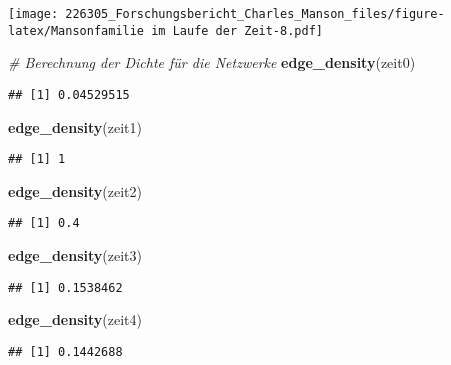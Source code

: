 \documentclass[
]{article}
\newenvironment{Shaded}{\begin{snugshade}}{\end{snugshade}}
\newcommand{\CommentTok}[1]{\textcolor[rgb]{0.56,0.35,0.01}{\textit{#1}}}
\newcommand{\KeywordTok}[1]{\textcolor[rgb]{0.13,0.29,0.53}{\textbf{#1}}}
\newcommand{\NormalTok}[1]{#1}
\begin{document}
\texttt{[image: 226305\_Forschungsbericht\_Charles\_Manson\_files/figure-latex/Mansonfamilie im Laufe der Zeit-8.pdf]}

\begin{Shaded}
\begin{Highlighting}[]
\CommentTok{# Berechnung der Dichte für die Netzwerke}
\KeywordTok{edge_density}\NormalTok{(zeit0)}
\end{Highlighting}
\end{Shaded}

\begin{verbatim}
## [1] 0.04529515
\end{verbatim}

\begin{Shaded}
\begin{Highlighting}[]
\KeywordTok{edge_density}\NormalTok{(zeit1)}
\end{Highlighting}
\end{Shaded}

\begin{verbatim}
## [1] 1
\end{verbatim}

\begin{Shaded}
\begin{Highlighting}[]
\KeywordTok{edge_density}\NormalTok{(zeit2)}
\end{Highlighting}
\end{Shaded}

\begin{verbatim}
## [1] 0.4
\end{verbatim}

\begin{Shaded}
\begin{Highlighting}[]
\KeywordTok{edge_density}\NormalTok{(zeit3)}
\end{Highlighting}
\end{Shaded}

\begin{verbatim}
## [1] 0.1538462
\end{verbatim}

\begin{Shaded}
\begin{Highlighting}[]
\KeywordTok{edge_density}\NormalTok{(zeit4)}
\end{Highlighting}
\end{Shaded}

\begin{verbatim}
## [1] 0.1442688
\end{verbatim}
\end{document}
